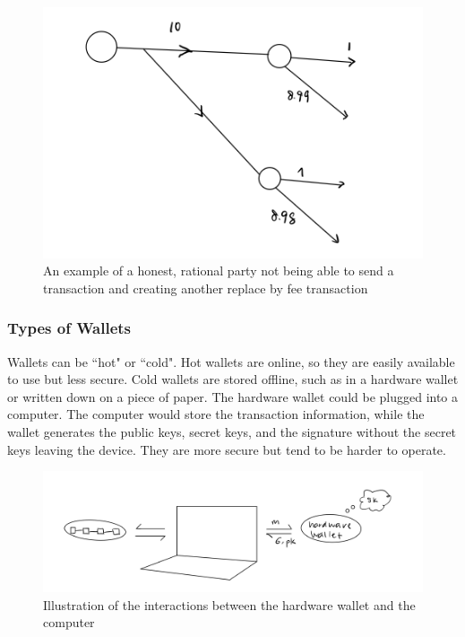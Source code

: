 \begin{figure}[ht]
    \centering
    \includegraphics[scale = 0.5]{figures/replace_by_fee.png}
    \caption{An example of a honest, rational party not being able to send a transaction and creating another replace by fee transaction}
    \label{fig:replace_by_fee}
\end{figure}


\subsubsection{Types of Wallets}
Wallets can be ``hot" or ``cold". Hot wallets are online, so they are easily available to use but less secure. Cold wallets are stored offline, such as in a hardware wallet or written down on a piece of paper. The hardware wallet could be plugged into a computer. The computer would store the transaction information, while the wallet generates the public keys, secret keys, and the signature without the secret keys leaving the device. They are more secure but tend to be harder to operate.


\begin{figure}[ht]
    \centering
    \includegraphics[scale = 0.5]{figures/hardware.png}
    \caption{Illustration of the interactions between the hardware wallet and the computer}
    \label{fig:hardware}
\end{figure}

